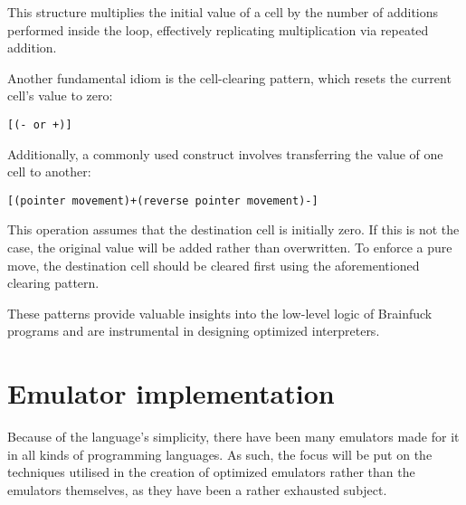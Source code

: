 \par This structure multiplies the initial value of a cell by the number of additions performed inside the loop, effectively replicating multiplication via repeated addition.

\par Another fundamental idiom is the cell-clearing pattern, which resets the current cell's value to zero:

\begin{verbatim}
[(- or +)]
\end{verbatim}

\par Additionally, a commonly used construct involves transferring the value of one cell to another:

\begin{verbatim}
[(pointer movement)+(reverse pointer movement)-]
\end{verbatim}

\par This operation assumes that the destination cell is initially zero. If this is not the case, the original value will be added rather than overwritten. To enforce a pure move, the destination cell should be cleared first using the aforementioned clearing pattern.

\par These patterns provide valuable insights into the low-level logic of Brainfuck programs and are instrumental in designing optimized interpreters.

\section{Emulator implementation}
\label{sec:ch2sec2}

\par Because of the language's simplicity, there have been many emulators made for it in all kinds of programming languages. As such, the focus will be put on the techniques utilised in the creation of optimized emulators rather than the emulators themselves, as they have been a rather exhausted subject.

